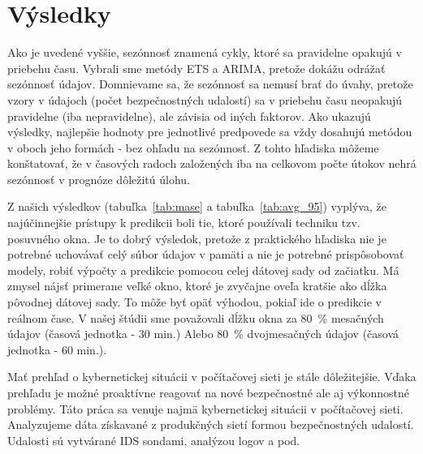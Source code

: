 \documentclass[thesismargins, thesislinespacing, openright, upjsfrontpage, combineabstracts]{rnthesis}
\begin{document}
\section{Výsledky}

Ako je uvedené vyššie, sezónnosť znamená cykly, ktoré sa pravidelne opakujú v priebehu času. Vybrali sme metódy ETS a ARIMA, pretože dokážu odrážať sezónnosť údajov. Domnievame sa, že sezónnosť sa nemusí brať do úvahy, pretože vzory v údajoch (počet bezpečnostných udalostí) sa v priebehu času neopakujú pravidelne (iba nepravidelne), ale závisia od iných faktorov. Ako ukazujú výsledky, najlepšie hodnoty pre jednotlivé predpovede sa vždy dosahujú metódou v oboch jeho formách - bez ohľadu na sezónnosť. Z tohto hľadiska môžeme konštatovať, že v časových radoch založených iba na celkovom počte útokov nehrá sezónnosť v prognóze dôležitú úlohu.

Z našich výsledkov (tabuľka~\ref{tab:mase} a tabuľka~\ref{tab:avg_95}) vyplýva, že najúčinnejšie prístupy k predikcii boli tie, ktoré používali techniku tzv. posuvného okna. Je to dobrý výsledok, pretože z praktického hľadiska nie je potrebné uchovávať celý súbor údajov v pamäti a nie je potrebné prispôsobovať modely, robiť výpočty a predikcie pomocou celej dátovej sady od začiatku. Má zmysel nájsť primerane veľké okno, ktoré je zvyčajne oveľa kratšie ako dĺžka pôvodnej dátovej sady. To môže byť opäť výhodou, pokiaľ ide o predikcie v reálnom čase. V našej štúdii sme považovali dĺžku okna za 80~\% mesačných údajov (časová jednotka - 30 min.) Alebo 80~\% dvojmesačných údajov (časová jednotka - 60 min.).


\zaver

Mať prehľad o kybernetickej situácii v počítačovej sieti je stále dôležitejšie. Vďaka prehľadu je možné proaktívne reagovať na nové bezpečnostné ale aj výkonnostné problémy. Táto práca sa venuje najmä kybernetickej situácii v počítačovej sieti. Analyzujeme dáta získavané z produkčných sietí formou bezpečnostných udalostí. Udalosti sú vytvárané IDS sondami, analýzou logov a pod. 
\end{document}
